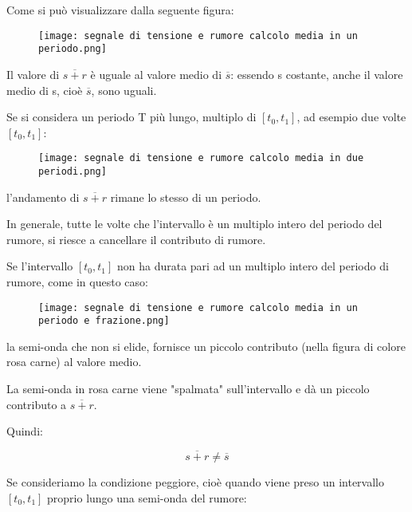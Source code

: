 Come si può visualizzare dalla seguente figura: 

\begin{figure}[h]
    \centering
    \texttt{[image: segnale di tensione e rumore calcolo media in un periodo.png]}
\end{figure}

Il valore di $\overline{s+r}$ è uguale al valore medio di $\overline{s}$: essendo s costante, anche il valore medio di s, cioè $\overline{s}$, 
sono uguali. \newline 

Se si considera un periodo T più lungo, multiplo di $[t_0, t_1]$, ad esempio due volte $[t_0, t_1]$:

\begin{figure}[h]
    \centering
    \texttt{[image: segnale di tensione e rumore calcolo media in due periodi.png]}
\end{figure}

l'andamento di $\overline{s + r}$ rimane lo stesso di un periodo. \newline 

In generale, tutte le volte che l'intervallo è un multiplo intero del periodo del rumore, si riesce a cancellare il contributo di rumore. \newline 

\newpage 


Se l'intervallo $[t_0, t_1]$ non ha durata pari ad un multiplo intero del periodo di rumore, 
come in questo caso: 

\begin{figure}[h]
    \centering
    \texttt{[image: segnale di tensione e rumore calcolo media in un periodo e frazione.png]}
\end{figure}

la semi-onda che non si elide, fornisce un piccolo contributo (nella figura di colore rosa carne) al valore medio. \newline 

La semi-onda in rosa carne viene "spalmata" sull'intervallo e dà un piccolo contributo a $\overline{s + r}$. \newline 

Quindi: 

{
    \Large 
    \begin{equation}
        \overline{s + r} \neq \overline{s}
    \end{equation}
}

Se consideriamo la condizione peggiore, cioè quando viene preso un intervallo $[t_0, t_1]$ 
proprio lungo una semi-onda del rumore: 

